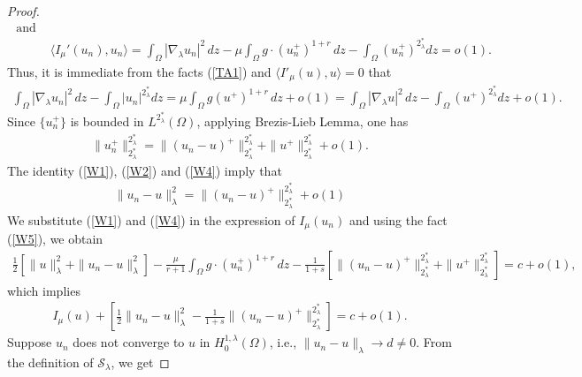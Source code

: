 \documentclass[12pt, notitlepage]{article}
\begin{document}
{\begin{proof}
\begin{align}
    \text{ and }&\nonumber\\
    &\langle I_\mu'(u_n),u_n\rangle=\int_\Omega |\nabla_\lambda u_n|^2\, dz-\mu\int_\Omega g\cdot(u_n^+)^{1+r} \, dz-\int_\Omega(u_n^+)^{2^*_\lambda} dz=o(1).\label{TA1}
\end{align}
Thus, it is immediate from the facts (\ref{TA1}) and $\langle I'_\mu(u),u\rangle=0$ that
\begin{align}\label{W2}
    \int_\Omega |\nabla_\lambda u_n|^2\, dz-\int_\Omega|u_n|^{2^*_\lambda} dz=\mu\int_\Omega g(u^+)^{1+r} \, dz + o(1)=\int_\Omega |\nabla_\lambda u|^2\, dz-\int_\Omega(u^+)^{2^*_\lambda} dz+o(1).
\end{align}
Since $\{u_n^+\}$ is bounded in $L^{2^*_\lambda}(\Omega)$, applying Brezis-Lieb Lemma, one has 
\begin{align}\label{W4}
  \|u_n^+\|_{2^*_\lambda}^{2^*_\lambda} = \|(u_n-u)^+\|_{2^*_\lambda}^{2^*_\lambda}+\|u^+\|_{2^*_\lambda}^{2^*_\lambda}+o(1).
\end{align}
The identity (\ref{W1}), (\ref{W2}) and (\ref{W4}) imply that
\begin{align}\label{W8}
    \|u_n-u\|_\lambda^2=\|(u_n-u)^+\|_{2^*_\lambda}^{2^*_\lambda}+o(1)
\end{align}
We substitute (\ref{W1}) and (\ref{W4}) in the expression of $I_\mu(u_n)$ and using the fact (\ref{W5}), we obtain 
\begin{align*}
    \frac{1}{2}\left [\|u\|_\lambda^2+\|u_n-u\|_\lambda^2 \right ]-\frac{\mu}{r+1}\int_\Omega g\cdot(u_n^+)^{1+r}\, dz-\frac{1}{1+s}\left [\|(u_n-u)^+\|_{2^*_\lambda}^{2^*_\lambda}+\|u^+\|_{2^*_\lambda}^{2^*_\lambda}\right ]=c+o(1),
\end{align*}
which implies
\begin{align}\label{W9}
    I_\mu(u)+\left [\frac{1}{2}\|u_n-u\|_\lambda^2-\frac{1}{1+s} \|(u_n-u)^+\|_{2^*_\lambda}^{2^*_\lambda} \right ]=c+o(1).
\end{align}
Suppose $u_n$ does not converge to $u$ in $H^{1,\lambda}_0(\Omega)$, i.e., $\|u_n-u\|_\lambda\to d\neq 0$. From the definition of $\mathcal{S}_\lambda$, we get


\end{proof}}
\end{document}
